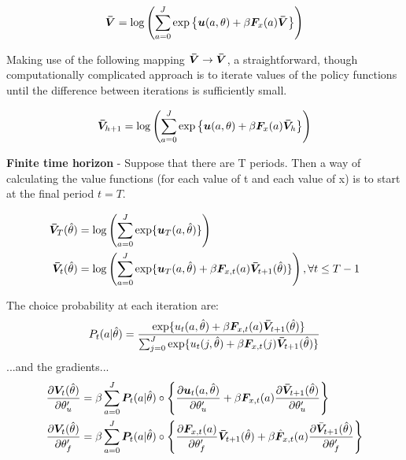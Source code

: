 \documentclass[11pt]{article}
\begin{document}
\begin{equation} \label{eq:valuefunciteration}
    \bm{\Bar{V}} = \log \left(\sum_{a=0}^J \exp \left\{ \bm{u}(a,\theta) + \beta \bm{F}_x(a) \bm{\Bar{V}} \right\} \right)
\end{equation}

Making use of the following mapping $\bm{\Bar{V}} \rightarrow \bm{\Bar{V}}$, a straightforward, though computationally complicated approach is to iterate values of the policy functions until the difference between iterations is sufficiently small.

\begin{equation}
    \bm{\Bar{V}}_{h+1} = \log \left(\sum_{a=0}^J \exp \left\{ \bm{u}(a,\theta) + \beta \bm{F}_x(a) \bm{\Bar{V}}_h \right\} \right)
\end{equation}

\textbf{Finite time horizon} - Suppose that there are T periods. Then a way of calculating the value functions (for each value of t and each value of x) is to start at the final period $t=T$. 

\begin{align}
    \bm{\Bar{V}}_T(\hat{\theta}) &= \log \left( \sum_{a=0}^J \exp \{\bm{u}_T(a,\hat{\theta})\} \right) \\
    \bm{\Bar{V}}_t(\hat{\theta}) &= \log \left( \sum_{a=0}^J \exp \{\bm{u}_T(a,\hat{\theta}) + \beta \bm{F}_{x,t}(a) \bm{\Bar{V}}_{t+1}(\hat{\theta})\} \right), \forall t \leq T-1
\end{align}

The choice probability at each iteration are:
\begin{equation}
    P_t(a|\hat{\theta}) = \frac{\exp\{u_t(a,\hat{\theta}) + \beta \bm{F}_{x,t}(a)\bm{\Bar{V}}_{t+1}(\hat{\theta})\}}{\sum_{j=0}^J \exp\{u_t(j,\hat{\theta}) + \beta \bm{F}_{x,t}(j)\bm{\Bar{V}}_{t+1}(\hat{\theta})\} }
\end{equation}
...and the gradients...
\begin{align}
    \frac{\partial \bm{V}_t(\hat{\theta})}{\partial \theta_u^\prime} &= \beta \sum_{a=0}^J \bm{P}_t(a|\hat{\theta}) \circ \left\{ \frac{\partial \bm{u}_t(a,\hat{\theta})}{\partial \theta_u^\prime} + \beta \bm{F}_{x,t}(a) \frac{\partial \bm{\Bar{V}}_{t+1}(\hat{\theta})}{\partial \theta_u^\prime} \right\}\\
    \frac{\partial \bm{V}_t(\hat{\theta})}{\partial \theta_f^\prime} &= \beta \sum_{a=0}^J \bm{P}_t(a|\hat{\theta}) \circ \left\{\frac{\partial \bm{F}_{x,t}(a)}{\partial \theta^\prime_f} \bm{\Bar{V}}_{t+1}(\hat{\theta})+ \beta \hat{\bm{F}}_{x,t}(a) \frac{\partial \Bar{\bm{V}}_{t+1}(\hat{\theta})}{\partial \theta_f^\prime}\right\}    
\end{align}
\end{document}
